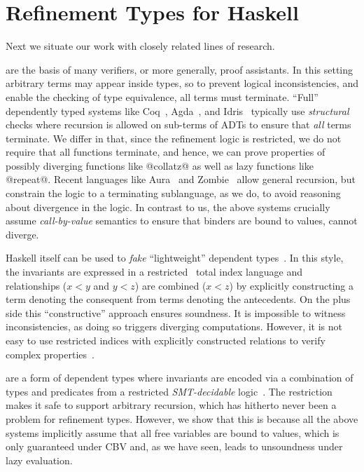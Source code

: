 \section{Refinement Types for Haskell}\label{sec:refinedhaskell:related}

Next we situate our work with closely related lines of research.

 are the basis of many verifiers, 
or more generally, proof assistants.
%
In this setting arbitrary terms may appear inside types,
so to prevent logical inconsistencies, and enable
the checking of type equivalence, all terms must
terminate.
%
``Full'' dependently typed systems like Coq~\cite{coq-book}, 
Agda~\cite{norell07}, and Idris~\cite{Brady13} typically use 
\emph{structural} checks where recursion is allowed on 
sub-terms of ADTs to ensure that \emph{all} terms terminate.
%
We differ in that, since the refinement logic is
restricted, we do not require that all functions terminate,
and hence, we can prove properties of possibly diverging 
functions like @collatz@ as well as lazy functions like @repeat@.
%
Recent languages like Aura~\citep{AURA} and Zombie~\citep{Zombie}
allow general recursion, but constrain the logic to a terminating 
sublanguage, as we do, to avoid reasoning 
about divergence in the logic.
%
In contrast to us, the above systems crucially assume 
\emph{call-by-value} semantics to ensure that binders are bound
to values, \ie cannot diverge.





   Haskell itself can be used to \emph{fake} ``lightweight'' dependent 
   types~\citep{ChakravartyKJ05,JonesVWW06,Weirich12}.
   In this style, the invariants are expressed in 
   a restricted~\citep{Jia10} total 
   index language and relationships (\eg $x<y$ and $y<z$) 
   are combined (\eg $x<z$) by explicitly constructing
   a term denoting the consequent from terms 
   denoting the antecedents.
   On the plus side this ``constructive'' approach
   ensures soundness. 
   It is impossible to witness inconsistencies, 
   as doing so triggers diverging computations.
   However, it is not easy to use restricted indices
   with explicitly constructed relations to verify 
   complex properties~\citep{hasochism}.


 are a form of dependent types where 
invariants are encoded via a combination of types and predicates
from a restricted \emph{SMT-decidable} 
logic~\cite{Rushby98,pfenningxi98,Dunfield07,GordonTOPLAS2011}. 
%
The restriction makes it safe to support arbitrary recursion, 
which has hitherto never been a problem for refinement types.
%
However, we show that this is because all the above systems 
implicitly assume that all free variables are bound to values, 
which is only guaranteed under CBV and, as we have seen, leads 
to unsoundness under lazy evaluation.



